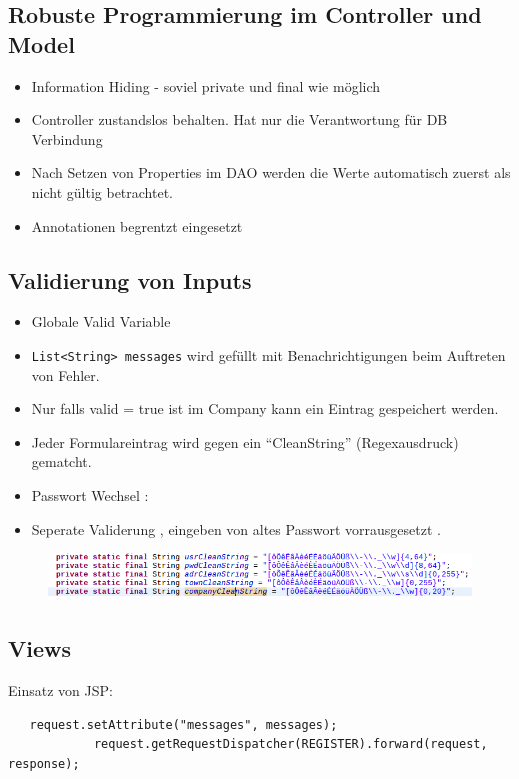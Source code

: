 \documentclass{beamer}
\begin{document}
\begin{frame}
 \section{Robuste Programmierung im Controller und Model}
 \begin{itemize}
 \item Information Hiding - soviel private und final wie möglich
 \item Controller zustandslos behalten. Hat nur die Verantwortung für DB Verbindung
 \item Nach Setzen von Properties im DAO werden die Werte automatisch zuerst als nicht gültig betrachtet.
  \item Annotationen begrentzt eingesetzt
 \end{itemize}
\end{frame}
\begin{frame}[fragile]
 \section*{Validierung von Inputs}
 \begin{itemize}
  \item Globale Valid Variable
  \item \texttt{List<String> messages} wird gefüllt mit Benachrichtigungen beim Auftreten von Fehler.
  \item Nur falls valid = true ist im Company kann ein Eintrag gespeichert werden.
  \item Jeder Formulareintrag wird gegen ein ``CleanString'' (Regexausdruck) gematcht.
  \item Passwort Wechsel :
  \item Seperate Validerung , eingeben von altes Passwort vorrausgesetzt .
 \end{itemize}
\begin{figure}[h]
 \centering
 \includegraphics[scale=0.4]{./code.png}
\end{figure}


\end{frame}

\begin{frame}[fragile]

\section{Views}
Einsatz von JSP:\\
\begin{lstlisting}
   request.setAttribute("messages", messages);
			request.getRequestDispatcher(REGISTER).forward(request, response);
\end{lstlisting}
\end{frame}
  
\end{document}
